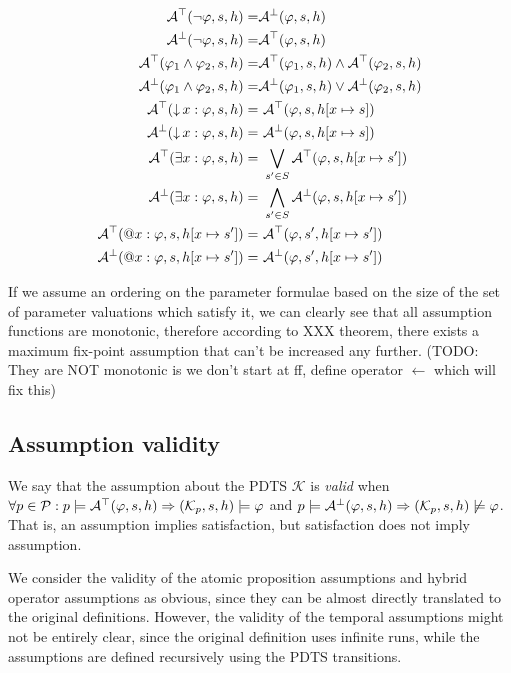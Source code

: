 \begin{align*}
	\assumeT(\neg \varphi, s, h) = & \assumeF(\varphi, s, h) \\
	\assumeF(\neg \varphi, s, h) = & \assumeT(\varphi, s, h) \\
	\assumeT(\varphi_1 \land \varphi_2, s, h) = & \assumeT(\varphi_1, s, h) \land \assumeT(\varphi_2, s, h) \\
	\assumeF(\varphi_1 \land \varphi_2, s, h) = & \assumeF(\varphi_1, s, h) \lor \assumeF(\varphi_2, s, h) \\
	\assumeT(\hctlBind{x} \varphi, s, h) = &\ \assumeT(\varphi, s, h[x \mapsto s]) \\
	\assumeF(\hctlBind{x} \varphi, s, h) = &\ \assumeF(\varphi, s, h[x \mapsto s]) \\
	\assumeT(\hctlExists{x} \varphi, s, h) = &\ \bigvee_{s' \in S} \assumeT(\varphi, s, h[x \mapsto s']) \\
	\assumeF(\hctlExists{x} \varphi, s, h) = &\ \bigwedge_{s' \in S} \assumeF(\varphi, s, h[x \mapsto s']) \\
	\assumeT(\hctlAt{x} \varphi, s, h[x \mapsto s']) = &\ \assumeT(\varphi, s', h[x \mapsto s']) \\
	\assumeF(\hctlAt{x} \varphi, s, h[x \mapsto s']) = &\ \assumeF(\varphi, s', h[x \mapsto s']) \\
\end{align*}

If we assume an ordering on the parameter formulae based on the size of the set of parameter valuations which satisfy it, we can clearly see that all assumption functions are monotonic, therefore according to XXX theorem, there exists a maximum fix-point assumption that can't be increased any further. (TODO: They are NOT monotonic is we don't start at ff, define operator $\gets$ which will fix this)

\subsection{Assumption validity}

We say that the assumption about the \ac{PDTS} $\mathcal{K}$ is \emph{valid} when $\forall p \in \mathcal{P} : p \models \mathcal{A}^\top(\varphi, s, h) \Rightarrow (\mathcal{K}_p, s, h) \models \varphi$ and $ p \models \mathcal{A}^\bot(\varphi, s, h) \Rightarrow (\mathcal{K}_p, s, h) \not\models \varphi$. That is, an assumption implies satisfaction, but satisfaction does not imply assumption.

We consider the validity of the atomic proposition assumptions and hybrid operator assumptions as obvious, since they can be almost directly translated to the original definitions. However, the validity of the temporal assumptions might not be entirely clear, since the original definition uses infinite runs, while the assumptions are defined recursively using the \ac{PDTS} transitions.

